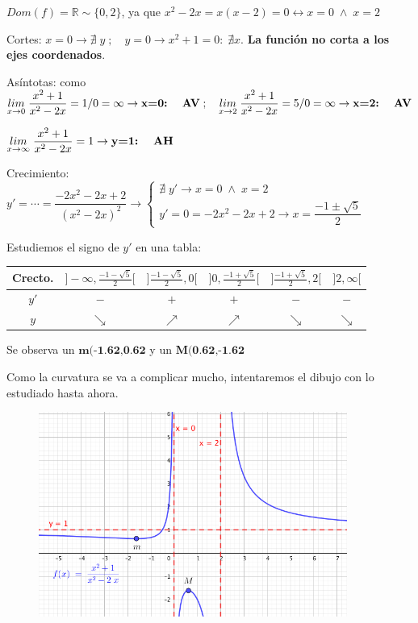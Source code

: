 \begin{proofw}\renewcommand{\qedsymbol}{$\diamond$}	
	$Dom(f)=\mathbb R \sim \{0,2\}$, ya que $x^2-2x=x(x-2)=0 \leftrightarrow x=0 \; \wedge \; x=2$
	
	Cortes: $x=0 \to \nexists \; y \; ; \quad y=0 \to x^2+1=0: \; \nexists x$. \textbf{La función no corta a los ejes coordenados}.
	
	Asíntotas:  como $\underset {x\to 0}{lim }\;{\dfrac {x^2+1}{x^2-2x}}=1/0=\infty \to \textbf{x=0: \; AV}\; ; \quad  \underset {x\to 2}{lim }\;{\dfrac {x^2+1}{x^2-2x}}=5/0=\infty \to \textbf{x=2: \; AV}$
	
		$\underset {x\to \infty}{lim}\; {\dfrac {x^2+1}{x^2-2x}}=1 \to \textbf{y=1: \; AH}$
		
		Crecimiento: $y'=\cdots=\dfrac {-2x^2-2x+2}{(x^2-2x)^2} \to \begin{cases}
 			\nexists \; y' \to x=0 \; \wedge \; x=2 \\
 			y'=0=-2x^2-2x+2 \to x=\dfrac {-1\pm \sqrt{5}}{2}
 			\end{cases}$
 			
 			Estudiemos el signo de $y'$ en una tabla:
 			
 	\begin{table}[H]
 	\centering
	\begin{tabular}{|c|c|c|c|c|c|}
	\hline
 	Crecto.& $]-\infty,\frac {-1-\sqrt{5}}{2}[$ & $]\frac {-1-\sqrt{5}}{2},0[$ & $]0,\frac {-1+\sqrt{5}}{2}[$ & $]\frac {-1+\sqrt{5}}{2},2[$  & $]2,\infty[$ \\ \hline
 	$y'$& $-$ &  $+$  & $+$   &  $-$  &  $-$  \\ \hline
 	$y$& $\searrow$ & $\nearrow$ &  $\nearrow$ & $\searrow$ & $\searrow$ \\ \hline
	\end{tabular}
	\end{table}
	
		Se observa un $\textbf{m(-1.62,0.62}$ y un $\textbf{M(0.62,-1.62}$
		
		Como la curvatura se va a complicar mucho, intentaremos el dibujo con lo estudiado hasta ahora.
		
		\begin{figure}[H]
			\centering
			\includegraphics[width=0.9\textwidth]{imagenes/imagenes05/T05IM32.png}
		\end{figure}
		
\end{proofw}


